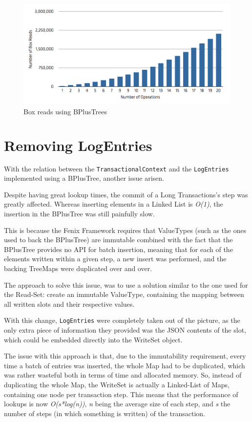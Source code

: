 \begin{figure}
\centering
\includegraphics[width=0.9\linewidth]{box-long-bplus}
\caption{Box reads using BPlusTrees}
\label{fig:boxesBPlus}
\end{figure}


\section{Removing LogEntries}

With the relation between the \texttt{TransactionalContext} and the
\texttt{LogEntries} implemented using a BPlusTree, another issue
arisen.

Despite having great lookup times, the commit of a Long Transactions's
step was greatly affected. Whereas inserting elements in a Linked List
is {\it O(1)}, the insertion in the BPlusTree was still painfully
slow.

This is because the Fenix Framework requires that ValueTypes (such as
the ones used to back the BPlusTree) are immutable combined with the
fact that the BPlusTree provides no API for batch insertion, meaning
that for each of the elements written within a given step, a new
insert was performed, and the backing TreeMaps were duplicated over
and over. 

The approach to solve this issue, was to use a solution similar to the
one used for the Read-Set: create an immutable ValueType, containing
the mapping between all written slots and their respective values.

With this change, \texttt{LogEntries} were completely taken out of the
picture, as the only extra piece of information they provided was the
JSON contents of the slot, which could be embedded directly into the
WriteSet object.

The issue with this approach is that, due to the immutability
requirement, every time a batch of entries was inserted, the whole Map
had to be duplicated, which was rather wasteful both in terms of time
and allocated memory. So, instead of duplicating the whole Map, the
WriteSet is actually a Linked-List of Maps, containing one node per
transaction step. This means that the performance of lookups is now
{\it O(s*log(n))}, {\it n} being the average size of each step, and
{\it s} the number of steps (in which something is written) of the
transaction.

